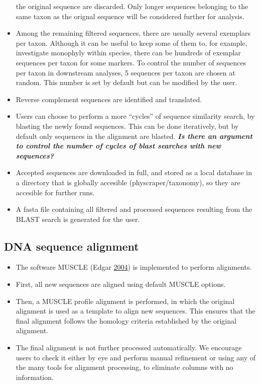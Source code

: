 \documentclass[]{article}
\providecommand{\tightlist}{%
  \setlength{\itemsep}{0pt}\setlength{\parskip}{0pt}}
\begin{document}
\begin{itemize}
  the original sequence are discarded. Only longer sequences belonging to the
  same taxon as the orignal sequence will be considered further for analysis.
\item
  Among the remaining filtered sequences, there are usually several exemplars per taxon.
  Although it can be useful to keep some of them to, for example, investigate monophyly
  within species, there can be hundreds of exemplar sequences per taxon for some markers.
  To control the number of sequences per taxon in downstream analyses,
  5 sequences per taxon are chosen at random. This number is set by default but can be modified by the user.
\item
  Reverse complement sequences are identified and translated.
\item
  Users can choose to perform a more ``cycles'' of sequence similarity search, by blasting the newly found sequences. This can be done iteratively, but by default only sequences in the alignment are blasted. \textbf{\emph{Is there an argument to control the number of cycles of blast searches with new sequences?}}
\item
  Accepted sequences are downloaded in full, and stored as a local database in a directory that is globally accesible (physcraper/taxonomy), so they are accesible for further runs.
\item
  A fasta file containing all filtered and processed sequences resulting from the BLAST search is generated for the user.
\end{itemize}

\hypertarget{dna-sequence-alignment}{%
\subsection{DNA sequence alignment}\label{dna-sequence-alignment}}

\begin{itemize}
\tightlist
\item
  The software MUSCLE (Edgar \protect\hyperlink{ref-edgar2004muscle}{2004}) is implemented to perform alignments.
\item
  First, all new sequences are aligned using default MUSCLE options.
\item
  Then, a MUSCLE profile alignment is performed, in which the original alignment
  is used as a template to align new sequences. This ensures that the final alignment
  follows the homology criteria established by the original alignment.
\item
  The final alignment is not further processed automatically. We encourage users
  to check it either by eye and perform manual refinement or using any of the many
  tools for alignment processing, to eliminate columns with no information.
\end{itemize}
\end{document}
